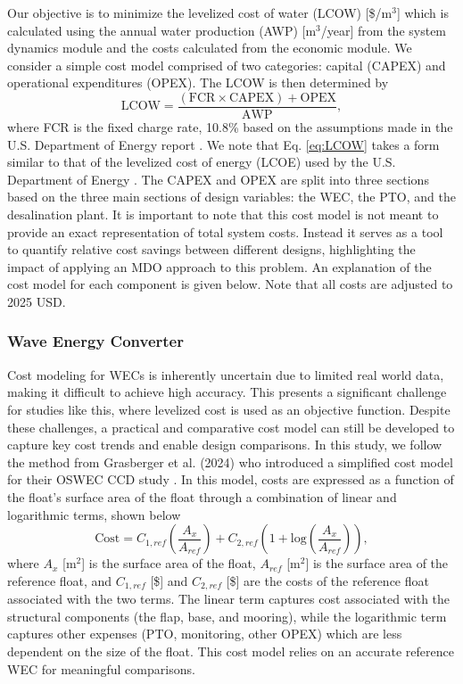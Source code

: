 \documentclass[twocolumn,10pt]{asme2e}
\begin{document}
Our objective is to minimize the levelized cost of water (LCOW) [\$/m$^3$] which is calculated using the annual water production (AWP) [m$^3$/year] from the system dynamics module and the costs calculated from the economic module. We consider a simple cost model comprised of two categories: capital (CAPEX) and operational expenditures (OPEX). The LCOW is then determined by
\begin{equation}
    \text{LCOW} = \frac{(\text{FCR}\times\text{CAPEX}) + \text{OPEX}}{\text{AWP}},
    \label{eq:LCOW}
\end{equation}
\noindent where FCR is the fixed charge rate, 10.8\% based on the assumptions made in the U.S. Department of Energy report \cite{LCOE_DOE}. We note that Eq. \ref{eq:LCOW} takes a form similar to that of the levelized cost of energy (LCOE) used by the U.S. Department of Energy \cite{LCOE_DOE}. The CAPEX and OPEX are split into three sections based on the three main sections of design variables: the WEC, the PTO, and the desalination plant. It is important to note that this cost model is not meant to provide an exact representation of total system costs. Instead it serves as a tool to quantify relative cost savings between different designs, highlighting the impact of applying an MDO approach to this problem. An explanation of the cost model for each component is given below. Note that all costs are adjusted to 2025 USD.

\subsubsection{Wave Energy Converter}

Cost modeling for WECs is inherently uncertain due to limited real world data, making it difficult to achieve high accuracy. This presents a significant challenge for studies like this, where levelized cost is used as an objective function. Despite these challenges, a practical and comparative cost model can still be developed to capture key cost trends and enable design comparisons. In this study, we follow the method from Grasberger et al. (2024) who introduced a simplified cost model for their OSWEC CCD study \cite{Grasberger2024}. In this model, costs are expressed as a function of the float's surface area of the float through a combination of linear and logarithmic terms, shown below
\begin{equation}
    \text{Cost} = C_{1,ref}\left(\frac{A_{x}}{A_{ref}}\right) + C_{2,ref}\left(1 + \text{log}\left(\frac{A_{x}}{A_{ref}}\right)\right),
\end{equation}
\noindent where $A_{x}$ [m$^2$] is the surface area of the float, $A_{ref}$ [m$^2$] is the surface area of the reference float, and $C_{1,ref}$ [\$] and $C_{2,ref}$ [\$] are the costs of the reference float associated with the two terms. The linear term captures cost associated with the structural components (the flap, base, and mooring), while the logarithmic term captures other expenses (PTO, monitoring, other OPEX) which are less dependent on the size of the float. This cost model relies on an accurate reference WEC for meaningful comparisons.
\end{document}

